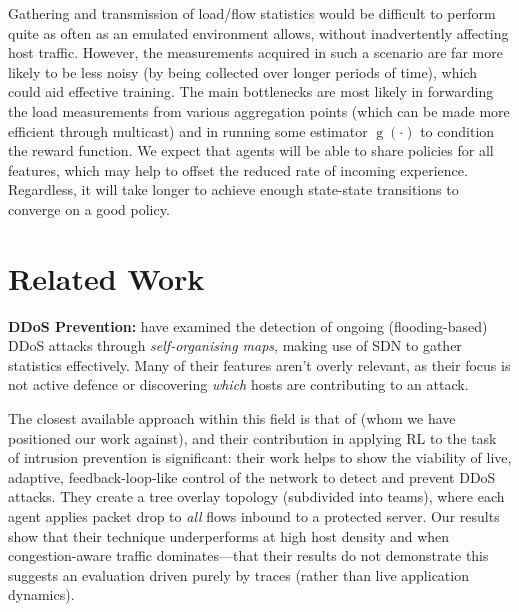\documentclass[10pt, times, conference, letterpaper]{IEEEtran}
\newcommand{\fakepara}[1]{\noindent\textbf{#1:}}
\begin{document}
Gathering and transmission of load/flow statistics would be difficult to perform quite as often as an emulated environment allows, without inadvertently affecting host traffic.
However, the measurements acquired in such a scenario are far more likely to be less noisy (by being collected over longer periods of time), which could aid effective training.
The main bottlenecks are most likely in forwarding the load measurements from various aggregation points (which can be made more efficient through multicast) and in running some estimator $\operatorname{g}(\cdot)$ to condition the reward function.
We expect that agents will be able to share policies for all features, which may help to offset the reduced rate of incoming experience.
Regardless, it will take longer to achieve enough state-state transitions to converge on a good policy.

\section{Related Work}\label{sec:related-work}


\fakepara{DDoS Prevention}
\Textcite{DBLP:conf/lcn/BragaMP10} have examined the detection of ongoing (flooding-based) DDoS attacks through \emph{self-organising maps}, making use of SDN to gather statistics effectively.
Many of their features aren't overly relevant, as their focus is not active defence or discovering \emph{which} hosts are contributing to an attack.

The closest available approach within this field is that of \textcite{DBLP:journals/eaai/MalialisK15} (whom we have positioned our work against), and their contribution in applying RL to the task of intrusion prevention is significant: their work helps to show the viability of live, adaptive, feedback-loop-like control of the network to detect and prevent DDoS attacks.
They create a tree overlay topology (subdivided into teams), where each agent applies packet drop to \emph{all} flows inbound to a protected server.
Our results show that their technique underperforms at high host density and when congestion-aware traffic dominates---that their results do not demonstrate this suggests an evaluation driven purely by traces (rather than live application dynamics).
\end{document}

